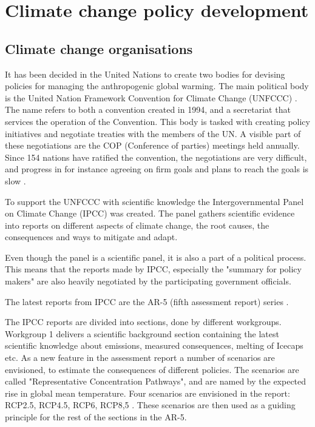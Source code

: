 \section{Climate change policy development}\label{politics}
\subsection{Climate change organisations}
It has been decided in the United Nations to create two bodies for devising policies for managing the anthropogenic global warming. The main political body is the United Nation Framework Convention for Climate Change (UNFCCC) \cite{schipper2009}. The name refers to both a convention created in 1994, and a secretariat that services the operation of the Convention. This body is tasked with creating policy initiatives and negotiate treaties with the members of the UN. A visible part of these negotiations are the COP (Conference of parties) meetings held annually. Since 154 nations have ratified the convention, the negotiations are very difficult, and progress in for instance agreeing on firm goals and plans to reach the goals is slow \cite{pielke1998}.

To support the UNFCCC with scientific knowledge the Intergovernmental Panel on Climate Change (IPCC) was created. The panel gathers scientific evidence into reports on different aspects of climate change, the root causes, the consequences and ways to mitigate and adapt.

Even though the panel is a scientific panel, it is also a part of a political process. This means that the reports made by IPCC, especially the "summary for policy makers" are also heavily negotiated by the participating government officials.

The latest reports from IPCC are the AR-5 (fifth assessment report) series .

The IPCC reports are divided into sections, done by different workgroups. Workgroup 1 delivers a scientific background section containing the latest scientific knowledge about emissions, measured consequences, melting of Icecaps etc. As a new feature in the assessment report a number of scenarios are envisioned, to estimate the consequences of different policies. The scenarios are called "Representative Concentration Pathways", and are named by the expected rise in global mean temperature. Four scenarios are envisioned in the report: RCP2.5, RCP4.5, RCP6, RCP8,5 \cite{stocker2013climate}. These scenarios are then used as a guiding principle for the rest of the sections in the AR-5.

